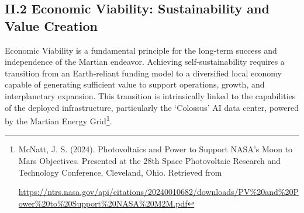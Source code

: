 \documentclass[fontsize=10pt, oneside, DIV=calc]{scrartcl}
\begin{document}
\subsection*{II.2 Economic Viability: Sustainability and Value Creation}



\medskip

\noindent
Economic Viability is a fundamental principle for the long-term success and independence of the Martian endeavor. Achieving self-sustainability requires a transition from an Earth-reliant funding model to a diversified local economy capable of generating sufficient value to support operations, growth, and interplanetary expansion. This transition is intrinsically linked to the capabilities of the deployed infrastructure, particularly the `Colossus' AI data center, powered by the Martian Energy Grid\footnote{McNatt, J. S. (2024). Photovoltaics and Power to Support NASA’s Moon to Mars Objectives. Presented at the 28th Space Photovoltaic Research and Technology Conference, Cleveland, Ohio. Retrieved from 







\href{https://ntrs.nasa.gov/api/citations/20240010682/downloads/PV\%20and\%20Power\%20to\%20Support\%20NASA\%20M2M.pdf}\url{https://ntrs.nasa.gov/api/citations/20240010682/downloads/PV\%20and\%20Power\%20to\%20Support\%20NASA\%20M2M.pdf}}.

\medskip
\end{document}
